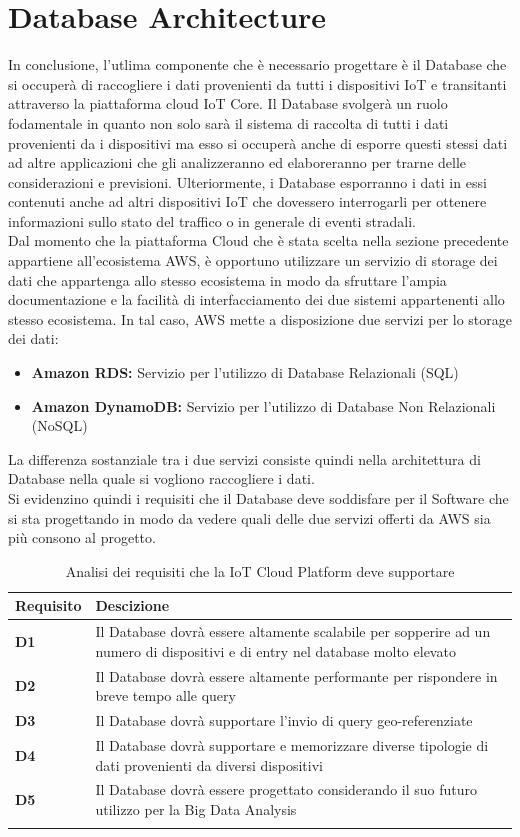 \section{Database Architecture}
\label{sec:database}
In conclusione, l'utlima componente che è necessario progettare è il Database che si occuperà di raccogliere i dati provenienti da tutti i dispositivi IoT e transitanti attraverso la piattaforma cloud IoT Core. 
Il Database svolgerà un ruolo fodamentale in quanto non solo sarà il sistema di raccolta di tutti i dati provenienti da i dispositivi ma esso si occuperà anche di esporre questi stessi dati ad altre applicazioni che gli analizzeranno ed elaboreranno per trarne delle considerazioni e previsioni. Ulteriormente, i Database esporranno i dati in essi contenuti anche ad altri dispositivi IoT che dovessero interrogarli per ottenere informazioni sullo stato del traffico o in generale di eventi stradali.\\
Dal momento che la piattaforma Cloud che è stata scelta nella sezione precedente appartiene all'ecosistema AWS, è opportuno utilizzare un servizio di storage dei dati che appartenga allo stesso ecosistema in modo da sfruttare l'ampia documentazione e la facilità di interfacciamento dei due sistemi appartenenti allo stesso ecosistema. In tal caso, AWS mette a disposizione due servizi per lo storage dei dati:
\begin{itemize}
	\item \textbf{Amazon RDS: } Servizio per l'utilizzo di Database Relazionali (SQL)
	\item \textbf{Amazon DynamoDB: } Servizio per l'utilizzo di Database Non Relazionali (NoSQL)
\end{itemize}
La differenza sostanziale tra i due servizi consiste quindi nella architettura di Database nella quale si vogliono raccogliere i dati.\\
Si evidenzino quindi i requisiti che il Database deve soddisfare per il Software che si sta progettando in modo da vedere quali delle due servizi offerti da AWS sia più consono al progetto.\\
\begin{longtable}{|m{2cm}|m{12cm}|}
	\hline
	\textbf{Requisito} & \textbf{Descizione} \\
	\hline
	\textbf{D1} &   Il Database dovrà essere altamente scalabile per sopperire ad un numero di dispositivi e di entry nel database molto elevato \\
	\hline
	\textbf{D2} &   Il Database dovrà essere altamente performante per rispondere  in breve tempo alle query \\
	\hline
	\textbf{D3} &   Il Database dovrà supportare l'invio di query geo-referenziate \\
	\hline
	\textbf{D4} &   Il Database dovrà supportare e memorizzare diverse tipologie di dati provenienti da diversi dispositivi \\
	\hline
	\textbf{D5} &   Il Database dovrà essere progettato considerando il suo futuro utilizzo per la Big Data Analysis  \\
	\hline
	\caption{Analisi dei requisiti che la IoT Cloud Platform deve supportare}
	\label{tabel:requisiti_database}
\end{longtable}
